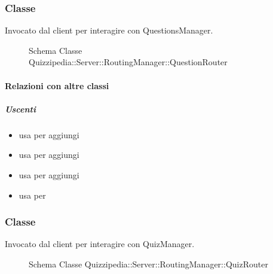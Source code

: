 \subsubsection{Classe }
Invocato dal client per interagire con QuestionsManager.
\begin{figure}[H]
\centering
\noindent{}
\caption[Schema Classe QuestionRouter]{Schema Classe Quizzipedia::Server::RoutingManager::QuestionRouter}
\end{figure}
\paragraph{Relazioni con altre classi}
\subparagraph{Uscenti}
\begin{itemize}
\item usa  per aggiungi
\item usa  per aggiungi
\item usa  per aggiungi
\item usa  per 
\end{itemize}
\subsubsection{Classe }
Invocato dal client per interagire con QuizManager.
\begin{figure}[H]
\centering
\noindent{}
\caption[Schema Classe QuizRouter]{Schema Classe Quizzipedia::Server::RoutingManager::QuizRouter}
\end{figure}
